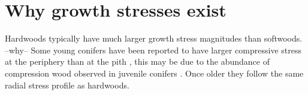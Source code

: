 \section{Why growth stresses exist}
Hardwoods typically have much larger growth stress magnitudes than softwoods.
--why-- \cite{barnett1981xylem} Some young conifers have been
reported to have larger compressive stress at the periphery than at the pith \cite{jacobs1945l}, this may be due to the abundance of compression wood observed in juvenile conifers \cite{timell1986compression}. Once older they follow the same radial stress profile
as hardwoods.
